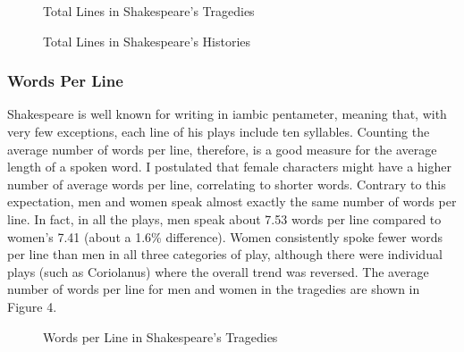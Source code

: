\documentclass[12pt]{article} %
\begin{document}
\begin{figure}[H] %
\caption{Total Lines in Shakespeare's Tragedies}
\label{fig:speciation}
\end{figure}

\begin{figure}[H] %
\caption{Total Lines in Shakespeare's Histories}
\label{fig:speciation}
\end{figure}


\subsubsection{Words Per Line} %
Shakespeare is well known for writing in iambic pentameter, meaning that, with very few exceptions, each line of his plays include ten syllables. Counting the average number of words per line, therefore, is a good measure for the average length of a spoken word. I postulated that female characters might have a higher number of average words per line, correlating to shorter words. Contrary to this expectation, men and women speak almost exactly the same number of words per line. In fact, in all the plays, men speak about 7.53 words per line compared to women's 7.41 (about a 1.6\% difference). Women consistently spoke fewer words per line than men in all three categories of play, although there were individual plays (such as Coriolanus) where the overall trend was reversed. The average number of words per line for men and women in the tragedies are shown in Figure 4.

\begin{figure}[H] %
\caption{Words per Line in Shakespeare's Tragedies}
\label{fig:speciation}
\end{figure}
\end{document}
